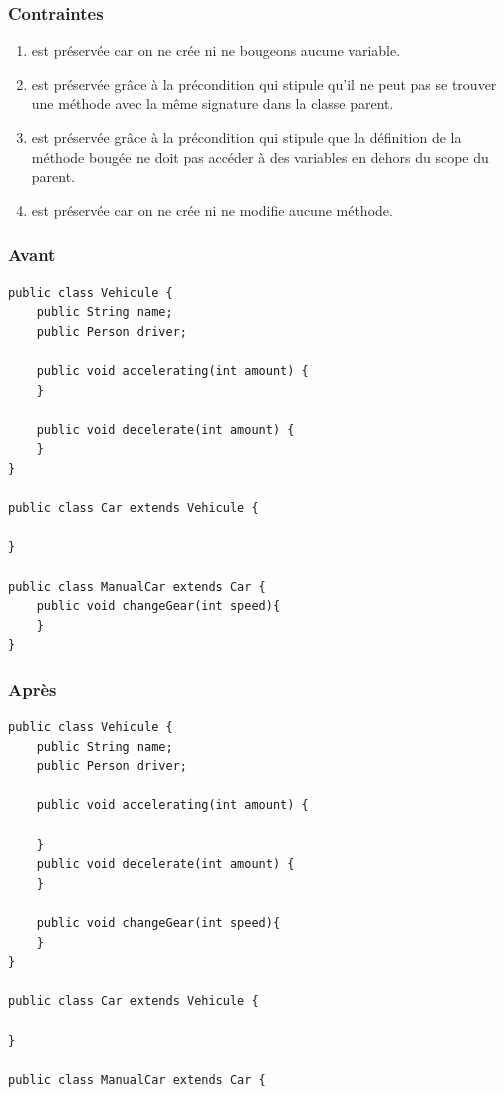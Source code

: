 \documentclass[a4paper, 12pt]{article}
\begin{document}
\begin{enumerate}
\subsubsection{Contraintes}

\begin{enumerate}
\item est préservée car on ne crée ni ne bougeons aucune variable.
\item est préservée grâce à la précondition qui stipule qu'il ne peut pas se trouver une méthode avec la même signature dans la classe parent.
\item est préservée grâce à la précondition qui stipule que la définition de la méthode bougée ne doit pas accéder à des variables en dehors du scope du parent.
\item est préservée car on ne crée ni ne modifie aucune méthode.
\end{enumerate}

\subsubsection{Avant}
\begin{lstlisting}[frame=single]
public class Vehicule {
	public String name;
	public Person driver;

	public void accelerating(int amount) { 
	}

	public void decelerate(int amount) { 
	}
}

public class Car extends Vehicule {

}

public class ManualCar extends Car {
	public void changeGear(int speed){ 
	}
}
\end{lstlisting}

\subsubsection{Après}
\begin{lstlisting}[frame=single]
public class Vehicule {
	public String name;
	public Person driver;

	public void accelerating(int amount) {

	}
	public void decelerate(int amount) { 
	}
	
	public void changeGear(int speed){
	}
}

public class Car extends Vehicule {

}

public class ManualCar extends Car {


\end{lstlisting}
\end{enumerate}
\end{document}

